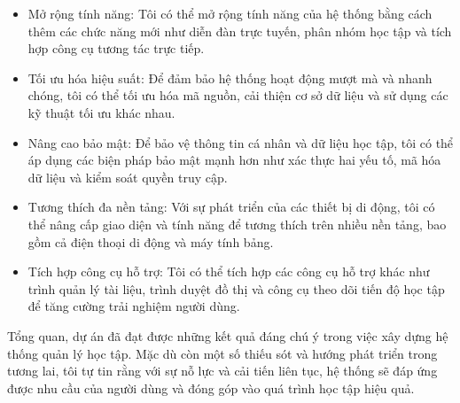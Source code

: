 \documentclass[../Thesis.tex]{subfiles}
\begin{document}
    \begin{itemize}
        \item Mở rộng tính năng: Tôi có thể mở rộng tính năng của hệ thống bằng cách thêm các chức năng mới như diễn đàn trực tuyến, phân nhóm học tập và tích hợp công cụ tương tác trực tiếp.

        \item Tối ưu hóa hiệu suất: Để đảm bảo hệ thống hoạt động mượt mà và nhanh chóng, tôi có thể tối ưu hóa mã nguồn, cải thiện cơ sở dữ liệu và sử dụng các kỹ thuật tối ưu khác nhau.
    
        \item Nâng cao bảo mật: Để bảo vệ thông tin cá nhân và dữ liệu học tập, tôi có thể áp dụng các biện pháp bảo mật mạnh hơn như xác thực hai yếu tố, mã hóa dữ liệu và kiểm soát quyền truy cập.
    
        \item Tương thích đa nền tảng: Với sự phát triển của các thiết bị di động, tôi có thể nâng cấp giao diện và tính năng để tương thích trên nhiều nền tảng, bao gồm cả điện thoại di động và máy tính bảng.
    
        \item Tích hợp công cụ hỗ trợ: Tôi có thể tích hợp các công cụ hỗ trợ khác như trình quản lý tài liệu, trình duyệt đồ thị và công cụ theo dõi tiến độ học tập để tăng cường trải nghiệm người dùng.
    
    \end{itemize}
Tổng quan, dự án đã đạt được những kết quả đáng chú ý trong việc xây dựng hệ thống quản lý học tập. Mặc dù còn một số thiếu sót và hướng phát triển trong tương lai, tôi tự tin rằng với sự nỗ lực và cải tiến liên tục, hệ thống sẽ đáp ứng được nhu cầu của người dùng và đóng góp vào quá trình học tập hiệu quả.
\end{document}
